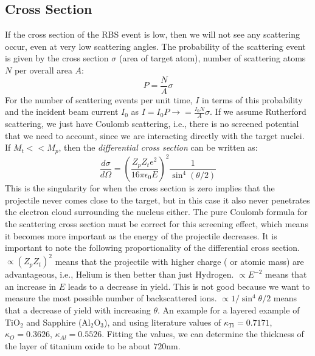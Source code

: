 \subsection{Cross Section}
If the cross section of the RBS event is low, then we will not see any scattering occur, even at very low scattering angles.
The probability of the scattering event is given by the cross section $\sigma$ (area of target atom), number of scattering atoms $N$ per overall area $A$:
$$ P = \frac{N}{A}\sigma$$
For the number of scattering events per unit time, $I$ in terms of this probability and the incident beam current $I_0$ as $I = I_0 P \rightarrow = \frac{I_0 N}{A} \sigma$.
If we assume Rutherford scattering, we just have Coulomb scattering, i.e., there is no screened potential that we need to account, since we are interacting directly with the target nuclei.
If $M_t << M_p$, then the \textit{differential cross section} can be written as:
\begin{equation}
	\frac{d\sigma}{d\Omega} = \left( \frac{Z_pZ_t e^2}{16\pi\epsilon_0 E}\right)^2 \frac{1}{\sin^4 \left(\theta / 2 \right)}
\end{equation}
This is the singularity for when the cross section is zero implies that the projectile never comes close to the target, but in this case it also never penetrates the electron cloud surrounding the nucleus either.
The pure Coulomb formula for the scattering cross section must be correct for this screening effect, which means it becomes more important as the energy of the projectile decreases.
It is important to note the following proportionality of the differential cross section.
$\propto (Z_p Z_t)^2 $ means that the projectile with higher charge ( or atomic mass) are advantageous, i.e., Helium is then better than just Hydrogen.
$\propto E^{-2}$ means that an increase in $E$ leads to a decrease in yield.
This is not good because we want to measure the most possible number of backscattered ions.
$\propto 1 / \sin^4 \theta / 2$ means that a decrease of yield with increasing $\theta$.
An example for a layered example of TiO$_2$ and Sapphire (Al$_2$O$_3$), and using literature values of $\kappa _{Ti} = 0.7171$, $\kappa_O = 0.3626$, $\kappa_{Al} = 0.5526$.
Fitting the values, we can determine the thickness of the layer of titanium oxide to be about $720$nm.


